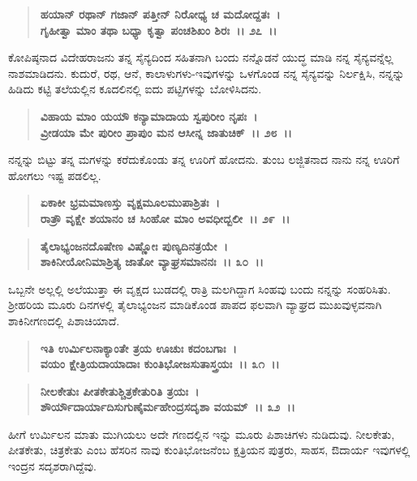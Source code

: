 \begin{verse}
\textbf{ಹಯಾನ್ ರಥಾನ್ ಗಜಾನ್ ಪತ್ತೀನ್ ನಿರೋಧ್ಯ ಚ ಮದೋದ್ದತಃ~।}\\\textbf{ಗೃಹೀತ್ವಾ ಮಾಂ ತಥಾ ಬಧ್ಯಾ ಕೃತ್ವಾ ಪಂಚಶಿಖಂ ಶಿರಃ~।। ೨೭~।।} 
\end{verse}

ಕೋಪಿಷ್ಠನಾದ ವಿದೇಹರಾಜನು ತನ್ನ ಸೈನ್ಯದಿಂದ ಸಹಿತನಾಗಿ ಬಂದು ನನ್ನೊಡನೆ ಯುದ್ಧ ಮಾಡಿ ನನ್ನ ಸೈನ್ಯವನ್ನೆಲ್ಲ ನಾಶಮಾಡಿದನು. ಕುದುರೆ, ರಥ, ಆನೆ, ಕಾಲಾಳುಗಳು-ಇವುಗಳನ್ನು ಒಳಗೊಂಡ ನನ್ನ ಸೈನ್ಯವನ್ನು ನಿರ್ಲಕ್ಷಿಸಿ, ನನ್ನನ್ನು ಹಿಡಿದು ಕಟ್ಟಿ ತಲೆಯಲ್ಲಿನ ಕೂದಲಿನಲ್ಲಿ ಐದು ಪಟ್ಟಿಗಳನ್ನು ಬೋಳಿಸಿದನು.

\begin{verse}
\textbf{ವಿಹಾಯ ಮಾಂ ಯಯೌ ಕನ್ಯಾಮಾದಾಯ ಸ್ವಪುರೀಂ ನೃಪಃ~।}\\\textbf{ವ್ರೀಡಯಾ ಮೇ ಪುರೀಂ ಪ್ರಾಪುಂ ಮನ ಆಸೀನ್ನ ಜಾತುಚಿಕ್~।। ೨೮~।।} 
\end{verse}

ನನ್ನನ್ನು ಬಿಟ್ಟು ತನ್ನ ಮಗಳನ್ನು ಕರೆದುಕೊಂಡು ತನ್ನ ಊರಿಗೆ ಹೋದನು. ತುಂಬ ಲಜ್ಜಿತ\-ನಾದ ನಾನು ನನ್ನ ಊರಿಗೆ ಹೋಗಲು ಇಷ್ಟ ಪಡಲಿಲ್ಲ.

\begin{verse}
\textbf{ಏಕಾಕೀ ಭ್ರಮಮಾಣಸ್ತು ವೃಕ್ಷಮೂಲಮುಪಾಶ್ರಿತಃ~।}\\\textbf{ರಾತ್ರೌ ವೃಕ್ಷೇ ಶಯಾನಂ ಚ ಸಿಂಹೋ ಮಾಂ ಅವಧೀದ್ಬಲೀ~।। ೨೯~।। }
\end{verse}

\begin{verse}
\textbf{ತೈಲಾಭ್ಯಂಜನದೊಷೇಣ ವಿಷ್ಣೋಃ ಪುಣ್ಯದಿನತ್ರಯೇ~।}\\\textbf{ಶಾಕಿನೀಯೋನಿಮಾಶ್ರಿತ್ಯ ಜಾತೋ ವ್ಯಾಘ್ರಸಮಾನನಃ~।। ೩೦~।।} 
\end{verse}

ಒಬ್ಬನೇ ಅಲ್ಲಲ್ಲಿ ಅಲೆಯುತ್ತಾ ಈ ವೃಕ್ಷದ ಬುಡದಲ್ಲಿ ರಾತ್ರಿ ಮಲಗಿದ್ದಾಗ ಸಿಂಹವು ಬಂದು ನನ್ನನ್ನು ಸಂಹರಿಸಿತು. ಶ‍್ರೀಹರಿಯ ಮೂರು ದಿನಗಳಲ್ಲಿ ತೈಲಾಭ್ಯಂಜನ ಮಾಡಿಕೊಂಡ ಪಾಪದ ಫಲವಾಗಿ ವ್ಯಾಘ್ರದ ಮುಖವುಳ್ಳವನಾಗಿ ಶಾಕಿನೀಗಣದಲ್ಲಿ ಪಿಶಾಚಿಯಾದೆ.

\begin{verse}
\textbf{ಇತಿ ಉರ್ಮಿಲನಾಕ್ಯಾಂತೇ ತ್ರಯ ಊಚುಃ ಕದಂಬಗಾಃ~।}\\\textbf{ವಯಂ ಕ್ಷೇತ್ರಿಯದಾಯಾದಾಃ ಕುಂತಿಭೋಜಸುತಾಸ್ತ್ರಯಃ~।। ೩೧~।। }
\end{verse}

\begin{verse}
\textbf{ನೀಲಕೇತುಃ ಪೀತಕೇತುಶ್ಚಿತ್ರಕೇತುರಿತಿ ತ್ರಯಃ~।}\\\textbf{ಶೌರ್ಯೌದಾರ್ಯಾದಿಸುಗುಣೈರ್ಮಹೇಂದ್ರಸದೃಶಾ ವಯಮ್~।। ೩೨~।। }
\end{verse}

ಹೀಗೆ ಉರ್ಮಿಲನ ಮಾತು ಮುಗಿಯಲು ಅದೇ ಗಣದಲ್ಲಿನ ಇನ್ನು ಮೂರು ಪಿಶಾಚಿಗಳು ನುಡಿದುವು. ನೀಲಕೇತು, ಪೀತಕೇತು, ಚಿತ್ರಕೇತು ಎಂಬ ಹೆಸರಿನ ನಾವು ಕುಂತಿಭೋಜನೆಂಬ ಕ್ಷತ್ರಿಯನ ಪುತ್ರರು, ಸಾಹಸ, ಔದಾರ್ಯ ಇವುಗಳಲ್ಲಿ ಇಂದ್ರನ ಸದೃಶರಾಗಿದ್ದೆವು.

